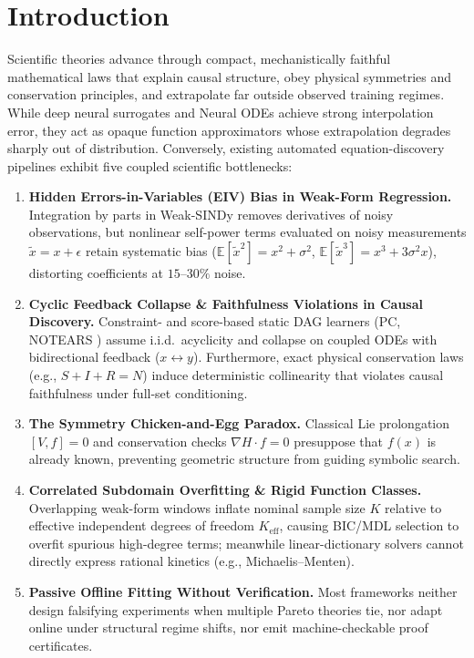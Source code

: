 \documentclass[11pt,a4paper]{article}
\begin{document}
\section{Introduction}
Scientific theories advance through compact, mechanistically faithful mathematical laws that explain causal structure, obey physical symmetries and conservation principles, and extrapolate far outside observed training regimes. While deep neural surrogates and Neural ODEs achieve strong interpolation error, they act as opaque function approximators whose extrapolation degrades sharply out of distribution. Conversely, existing automated equation-discovery pipelines exhibit five coupled scientific bottlenecks:

\begin{enumerate}
  \item \textbf{Hidden Errors-in-Variables (EIV) Bias in Weak-Form Regression.} Integration by parts in Weak-SINDy \cite{messenger2021weak} removes derivatives of noisy observations, but nonlinear self-power terms evaluated on noisy measurements $\tilde{x} = x + \epsilon$ retain systematic bias ($\mathbb{E}[\tilde{x}^2] = x^2 + \sigma^2$, $\mathbb{E}[\tilde{x}^3] = x^3 + 3\sigma^2 x$), distorting coefficients at $15\text{--}30\%$ noise.
  \item \textbf{Cyclic Feedback Collapse \& Faithfulness Violations in Causal Discovery.} Constraint- and score-based static DAG learners (PC, NOTEARS \cite{zheng2018notears}) assume i.i.d.\ acyclicity and collapse on coupled ODEs with bidirectional feedback ($x \leftrightarrow y$). Furthermore, exact physical conservation laws (e.g., $S+I+R=N$) induce deterministic collinearity that violates causal faithfulness under full-set conditioning.
  \item \textbf{The Symmetry Chicken-and-Egg Paradox.} Classical Lie prolongation $[V, f]=0$ \cite{olver1993applications} and conservation checks $\nabla H \cdot f = 0$ presuppose that $f(x)$ is already known, preventing geometric structure from guiding symbolic search.
  \item \textbf{Correlated Subdomain Overfitting \& Rigid Function Classes.} Overlapping weak-form windows inflate nominal sample size $K$ relative to effective independent degrees of freedom $K_{\text{eff}}$, causing BIC/MDL selection to overfit spurious high-degree terms; meanwhile linear-dictionary solvers cannot directly express rational kinetics (e.g., Michaelis--Menten).
  \item \textbf{Passive Offline Fitting Without Verification.} Most frameworks neither design falsifying experiments when multiple Pareto theories tie, nor adapt online under structural regime shifts, nor emit machine-checkable proof certificates.
\end{enumerate}
\end{document}
